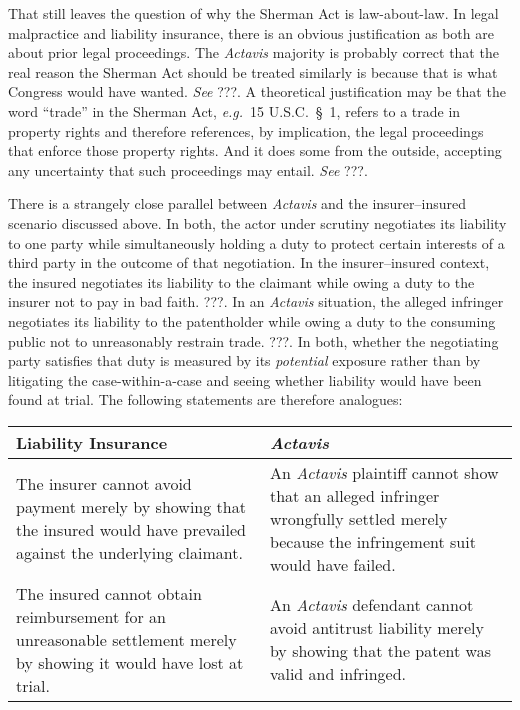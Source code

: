 \documentclass[
  12pt,
  letterpaper,
]{scrartcl}
\begin{document}
That still leaves the question of why the Sherman Act is law-about-law. In
legal malpractice and liability insurance, there is an obvious justification as
both are about prior legal proceedings. The \textit{Actavis} majority is
probably correct that the real reason the Sherman Act should be treated
similarly is because that is what Congress would have wanted. \textit{See} ???.
A theoretical justification may be that the word ``trade'' in the Sherman Act,
\textit{e.g.}~15 U.S.C.~§~1, refers to a trade in property rights and therefore
references, by implication, the legal proceedings that enforce those property
rights. And it does some from the outside, accepting any uncertainty that
such proceedings may entail. \textit{See} ???.

There is a strangely close parallel between \textit{Actavis} and the
insurer--insured scenario discussed above. In both, the actor under scrutiny
negotiates its liability to one party while simultaneously holding a duty to
protect certain interests of a third party in the outcome of that negotiation.
In the insurer--insured context, the insured negotiates its liability to the
claimant while owing a duty to the insurer not to pay in bad faith. ???. In an
\emph{Actavis} situation, the alleged infringer negotiates its liability to the
patentholder while owing a duty to the consuming public not to unreasonably
restrain trade. ???. In both, whether the negotiating party satisfies that duty
is measured by its \emph{potential} exposure rather than by litigating the
case-within-a-case and seeing whether liability would have been found at trial.
The following statements are therefore analogues:

\vspace{18pt}%
{%
  \setlength\extrarowheight{3pt}%
  \noindent\begin{tabular}{p{3in}|p{3in}}
  \textbf{Liability Insurance} & \textbf{\textit{Actavis}} \\[3pt] \hline
  {The insurer cannot avoid payment merely by showing that the insured
  would have prevailed against the underlying claimant.} &
  {An \textit{Actavis} plaintiff cannot show that an alleged infringer wrongfully
  settled merely because the infringement suit would have failed.} \\[3pt] \hline
  {The insured cannot obtain reimbursement for an unreasonable settlement merely by showing
  it would have lost at trial.} &
  {An \textit{Actavis} defendant cannot avoid
  antitrust liability merely by showing that the patent was valid and infringed.}
\end{tabular}}\vspace{18pt}
\end{document}
